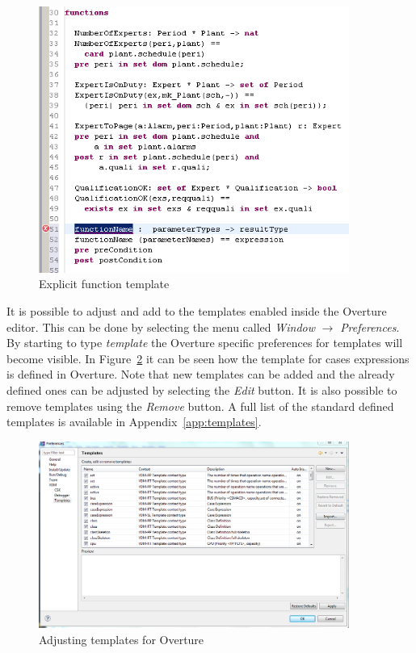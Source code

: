 \documentclass{overturerepchap}
\begin{document}
\begin{figure}
\begin{center}
\includegraphics[width=4in]{figures/FunctionTemplate}
\caption{Explicit function template}
\label{fig:functionTemplate}
\end{center}
\end{figure}

It is possible to adjust and add to the templates enabled inside the
Overture editor. This can be done by selecting the menu called
\emph{Window} $\rightarrow$ \emph{Preferences}. By starting to type
\emph{template} the Overture specific preferences for templates will
become visible. In Figure~\ref{fig:Templatepreferences} it can be seen
how the template for cases expressions is defined in Overture. Note
that new templates can be added and the already defined ones can be
adjusted by selecting the \emph{Edit} button. It is also possible to
remove templates using the \emph{Remove} button. A full list of the
standard defined templates is available in Appendix~\ref{app:templates}.

\begin{figure}
\begin{center}
\includegraphics[width=4in]{screendumps/templatesRT}
\caption{Adjusting templates for Overture}
\label{fig:Templatepreferences}
\end{center}
\end{figure}
\end{document}
